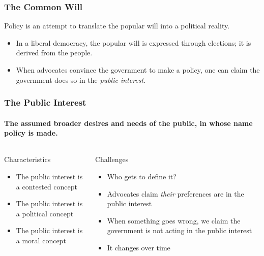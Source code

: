\documentclass[10pt]{beamer}
\begin{document}
\begin{frame}
\frametitle{The Common Will}

\begin{block}{}
\centering
Policy is an attempt to translate the popular will into a political reality.
\end{block}

\vspace{0.5cm}

\begin{itemize}
\item<1-> In a liberal democracy, the popular will is expressed through elections; it is derived from the people.
\item<2-> When advocates convince the government to make a policy, one can claim the government does so in the \emph{public interest}.
\end{itemize}

\end{frame}

\begin{frame}
\frametitle{The Public Interest}
\framesubtitle{The assumed broader desires and needs of the public, in whose name policy is made.}

\begin{columns}
\begin{column}{0.48\textwidth}
\begin{block}{Characteristics}
\begin{itemize}
\item<1-> The public interest is a contested concept
\item<2-> The public interest is a political concept
\item<3-> The public interest is a moral concept
\end{itemize}
\end{block}
\end{column}

\begin{column}{0.48\textwidth}
\begin{alertblock}{Challenges}
\begin{itemize}
\item<4-> Who gets to define it?
\item<5-> Advocates claim \emph{their} preferences are in the public interest
\item<6-> When something goes wrong, we claim the government is not acting in the public interest
\item<7-> It changes over time
\end{itemize}
\end{alertblock}
\end{column}
\end{columns}

\end{frame}
\end{document}
